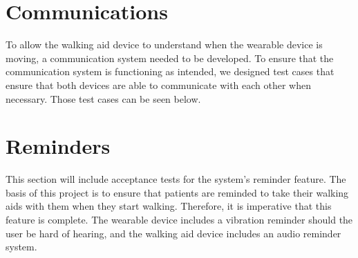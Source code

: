         \vspace{4em}
        

        \vspace{4em}
        

    \section{Communications}
    \label{sec:test_comms}

        To allow the walking aid device to understand when the wearable device is moving, a communication system needed to be developed. To ensure that the communication system is functioning as intended, we designed test cases that ensure that both devices are able to communicate with each other when necessary. Those test cases can be seen below.

        \vspace{1em}
        

        \vspace{4em}
        

        \vspace{4em}
        

        \vspace{4em}
        

    \section{Reminders}
    \label{sec:test_reminders}

        This section will include acceptance tests for the system's reminder feature. The basis of this project is to ensure that patients are reminded to take their walking aids with them when they start walking. Therefore, it is imperative that this feature is complete. The wearable device includes a vibration reminder should the user be hard of hearing, and the walking aid device includes an audio reminder system.

        \vspace{1em}
        

        \vspace{4em}
        
